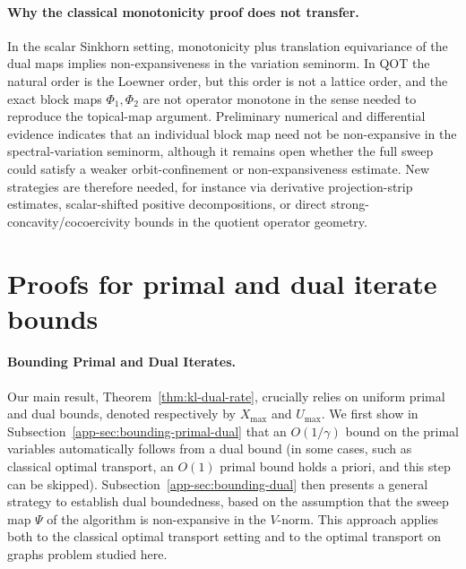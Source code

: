 \documentclass{article}
\theoremstyle{plain}
\begin{document}
\paragraph{Why the classical monotonicity proof does not transfer.}
In the scalar Sinkhorn setting, monotonicity plus translation equivariance of the dual maps implies non-expansiveness in the variation seminorm. In QOT the natural order is the Loewner order, but this order is not a lattice order, and the exact block maps $\Phi_1,\Phi_2$ are not operator monotone in the sense needed to reproduce the topical-map argument. Preliminary numerical and differential evidence indicates that an individual block map need not be non-expansive in the spectral-variation seminorm, although it remains open whether the full sweep could satisfy a weaker orbit-confinement or non-expansiveness estimate. New strategies are therefore needed, for instance via derivative projection-strip estimates, scalar-shifted positive decompositions, or direct strong-concavity/cocoercivity bounds in the quotient operator geometry.
\section{Proofs for primal and dual iterate bounds}
\label{app-app:primaldual-proofs}


\paragraph{Bounding Primal and Dual Iterates.}
\label{app-sec:dual-primal-dual}

Our main result, Theorem~\ref{thm:kl-dual-rate}, crucially relies on uniform primal and dual bounds, denoted respectively by $X_{\max}$ and $U_{\max}$.
%
We first show in Subsection~\ref{app-sec:bounding-primal-dual} that an $O(1/\gamma)$ bound on the primal variables automatically follows from a dual bound (in some cases, such as classical optimal transport, an $O(1)$ primal bound holds a priori, and this step can be skipped).
%
Subsection~\ref{app-sec:bounding-dual} then presents a general strategy to establish dual boundedness, based on the assumption that the sweep map $\Psi$ of the algorithm is non-expansive in the $V$-norm. This approach applies both to the classical optimal transport setting and to the optimal transport on graphs problem studied here.


\end{document}
